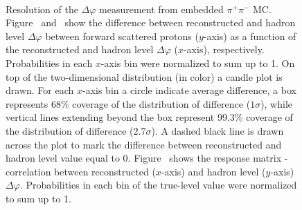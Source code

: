 \begin{figure}[h]
{  \centering
  \begin{subfigure}[b]{\linewidth}\addtocounter{subfigure}{-2}\vspace*{-12pt}
  \end{subfigure}\\
    \begin{minipage}[t][1.042\linewidth][t]{\linewidth}\vspace{10pt}
    \caption[Resolution of the $\Delta\varphi$ measurement from embedded $\pi^{+}\pi^{-}$ MC.]{Resolution of the $\Delta\varphi$ measurement from embedded $\pi^{+}\pi^{-}$ MC. Figure~ and~ show the difference between reconstructed and hadron level $\Delta\varphi$ between forward scattered protons ($y$-axis) as a function of the reconstructed and hadron level $\Delta\varphi$ ($x$-axis), respectively. Probabilities in each $x$-axis bin were normalized to sum up to 1. On top of the two-dimensional distribution (in color) a candle plot is drawn. For each $x$-axis bin a circle indicate average difference, a box represents 68\% coverage of the distribution of difference ($1\sigma$), while vertical lines extending beyond the box represent 99.3\% coverage of the distribution of difference ($2.7\sigma$). A dashed black line is drawn across the plot to mark the difference between reconstructed and hadron level value equal to 0. Figure~ shows the response matrix - correlation between reconstructed ($x$-axis) and hadron level ($y$-axis) $\Delta\varphi$. Probabilities in each bin of the true-level value were normalized to sum up to 1.}\label{fig:Response_DeltaPhi}%
  \end{minipage}
}%
\end{figure}


